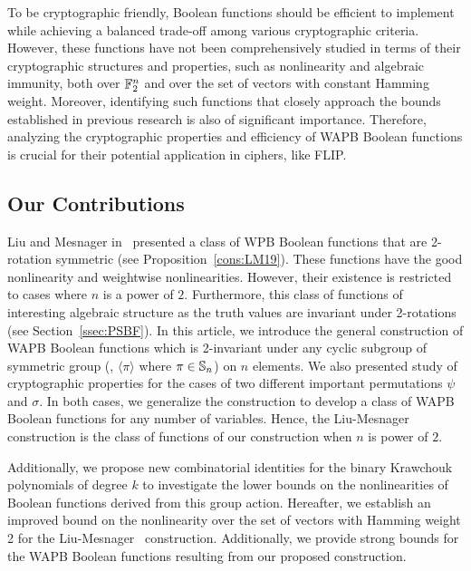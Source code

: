 \documentclass{llncs}
\begin{document}
To be cryptographic friendly, Boolean functions should be efficient to implement while achieving a balanced trade-off among various cryptographic criteria. 
However, these functions have not been comprehensively studied in terms of their cryptographic structures and properties, such as nonlinearity and algebraic immunity, both over $\mathbb{F}_2^n$ and over the set of vectors with constant Hamming weight. 
Moreover, identifying such functions that closely approach the bounds established in previous research is also of significant importance. 
Therefore, analyzing the cryptographic properties and efficiency of WAPB Boolean functions is crucial for their potential application in ciphers, like FLIP. 

\subsection{Our Contributions}
Liu and Mesnager in~\cite{DCC:LiuMes19} presented a class of WPB Boolean functions that are 2-rotation symmetric (see Proposition~\ref{cons:LM19}).
These functions have the good nonlinearity and weightwise nonlinearities. 
However, their existence is restricted to cases where $n$ is a power of $2$. 
Furthermore, this class of functions of interesting algebraic structure as the truth values are invariant under 2-rotations (see Section~\ref{ssec:PSBF}).
In this article, we introduce the general construction of WAPB Boolean functions which is 2-invariant under any cyclic subgroup of symmetric group (\ie, $\langle \pi \rangle$ where $\pi \in \mathbb{S}_n$) on $n$ elements. 
We also presented study of cryptographic properties for the cases of two different important permutations $\psi$ and $\sigma$. In both cases, we generalize the construction to develop a class of WAPB Boolean functions for any number of variables. Hence, the Liu-Mesnager construction is the class of functions of our construction when $n$ is power of $2$.

Additionally, we propose new combinatorial identities for the binary Krawchouk polynomials of degree $k$ to investigate the lower bounds on the nonlinearities of Boolean functions derived from this group action. 
Hereafter, we establish an improved bound on the nonlinearity over the set of vectors with Hamming weight 2 for the Liu-Mesnager~\cite{DCC:LiuMes19} construction. Additionally, we provide strong bounds for the WAPB Boolean functions resulting from our proposed construction.
\end{document}

